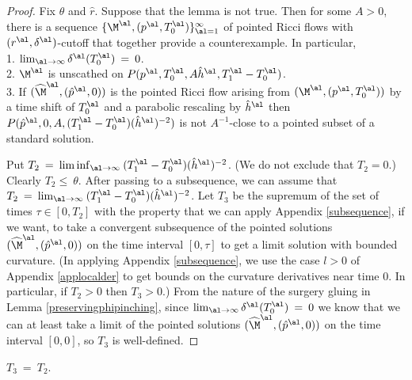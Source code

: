 \begin{proof}
Fix $\theta$ and $\hat{r}$.
Suppose that the lemma is not true. Then for some $A > 0$,
there is a sequence $\{\M^\al, (p^\al,T_0^\al) \}_{\al = 1}^\infty$ of
pointed Ricci flows with $(r^\al, \delta^\al)$-cutoff
that together provide a
counterexample. In particular,\\
1. $\lim_{\al \rightarrow \infty}
\delta^\al (T_0^\al) \: = \: 0$. \\
2. $\M^\al$ is unscathed on
$P(p^\al, T_0^\al, A {\hat h}^\al, T_1^\al - T_0^\al)$.\\
3. If
$(\widehat{\M}^\al, (\hat{p}^\al,0))$ is the pointed Ricci
flow arising from $(\M^\al, (p^\al,T_0^\al))$ by
a time shift of $T_0^\al$ and a
parabolic rescaling by ${\hat h}^\al$ then
$P(\hat{p}^\al, 0, A, (T_1^\al - T_0^\al)(\hat{h}^\al)^{-2})$
is not $A^{-1}$-close to a pointed
subset of a standard solution.

Put $T_2 \: = \: \liminf_{\al \rightarrow \infty} \: (T_1^\al - T_0^\al)(\hat{h}^\al)^{-2}$. (We do
not exclude that $T_2 = 0$.) Clearly $T_2 \le \: \theta$.
After passing to a subsequence, we can assume that
$T_2 \: = \: \lim_{\al \rightarrow \infty} \: (T_1^\al - T_0^\al)(\hat{h}^\al)^{-2}$.
Let $T_3$ be the supremum of the set of times
$\tau \in [0, T_2]$ with the property that we can apply
Appendix \ref{subsequence}, if we want,
to take a convergent subsequence of the pointed solutions
$(\widehat{\M}^\al, (\hat{p}^\al,0))$ on the time interval $[0, \tau]$ to get
a limit solution with bounded curvature.
(In applying Appendix \ref{subsequence}, we use the case $l >0$ of
Appendix \ref{applocalder} to get bounds on the
curvature derivatives near time $0$. In particular, if
$T_2 > 0$ then $T_3 > 0$.)
From the nature of the
surgery gluing in Lemma \ref{preservingphipinching},
since $\lim_{\al \rightarrow \infty}
\delta^\al (T_0^\al) \: = \: 0$
we know that we can at least
take a limit of the pointed solutions
$(\widehat{\M}^\al, (\hat{p}^\al,0))$ on the time interval $[0,0]$,
so $T_3$ is well-defined.

\end{proof}
\begin{lemma}
  \label{lem:kl-evolution-surgery-cap-ricci-flow-surgery-lemma}

$T_3 \: = \: T_2$.
\end{lemma}
